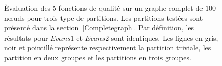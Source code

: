 \begin{figure}
\centering
		
		
		\caption{\`Evaluation des 5 fonctions de qualité sur un graphe complet  de $100$ n\oe uds pour trois type de partitions.
		Les partitions testées sont présenté dans la section~\ref{Completegraph}.
		Par définition, les résultats pour $Evans1$ et $Evans2$ sont identiques.
		Les lignes en gris, noir et pointillé représente respectivement la partition triviale, les partition en deux groupes et les partitions en trois groupes.}
		\label{fig:1Cres}
\end{figure}


